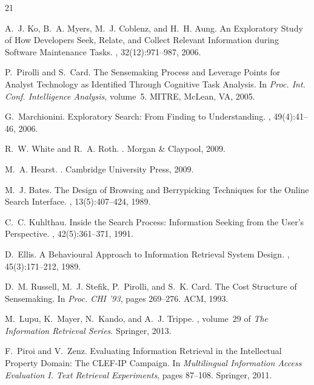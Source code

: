 \documentclass[sigconf]{acmart}
\begin{document}
\begin{thebibliography}{21}

A.~J. Ko, B.~A. Myers, M.~J. Coblenz, and H.~H. Aung.
\newblock An Exploratory Study of How Developers Seek, Relate, and Collect
  Relevant Information during Software Maintenance Tasks.
, 32(12):971--987, 2006.

P.~Pirolli and S.~Card.
\newblock The Sensemaking Process and Leverage Points for Analyst Technology
  as Identified Through Cognitive Task Analysis.
\newblock In {\em Proc. Int. Conf. Intelligence Analysis}, volume~5.
  MITRE, McLean, VA, 2005.

G.~Marchionini.
\newblock Exploratory Search: From Finding to Understanding.
, 49(4):41--46, 2006.

R.~W. White and R.~A. Roth.
.
\newblock Morgan \& Claypool, 2009.

M.~A. Hearst.
.
\newblock Cambridge University Press, 2009.

M.~J. Bates.
\newblock The Design of Browsing and Berrypicking Techniques for the Online
  Search Interface.
, 13(5):407--424, 1989.

C.~C. Kuhlthau.
\newblock Inside the Search Process: Information Seeking from the User's
  Perspective.
,
  42(5):361--371, 1991.

D.~Ellis.
\newblock A Behavioural Approach to Information Retrieval System Design.
, 45(3):171--212, 1989.

D.~M. Russell, M.~J. Stefik, P.~Pirolli, and S.~K. Card.
\newblock The Cost Structure of Sensemaking.
\newblock In {\em Proc. CHI '93}, pages 269--276. ACM, 1993.

M.~Lupu, K.~Mayer, N.~Kando, and A.~J. Trippe.
,
  volume~29 of {\em The Information Retrieval Series}.
\newblock Springer, 2013.

F.~Piroi and V.~Zenz.
\newblock Evaluating Information Retrieval in the Intellectual Property
  Domain: The CLEF-IP Campaign.
\newblock In {\em Multilingual Information Access Evaluation I. Text Retrieval
  Experiments}, pages 87--108. Springer, 2011.


\end{thebibliography}
\end{document}
